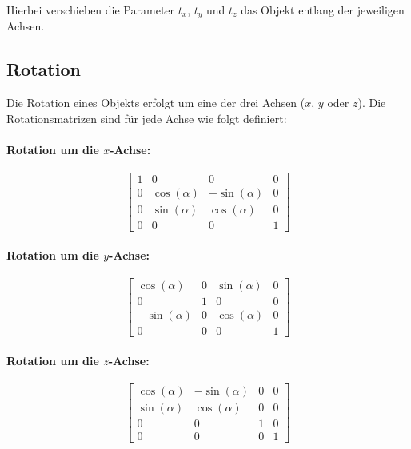 Hierbei verschieben die Parameter \(t_x\), \(t_y\) und \(t_z\) das Objekt entlang der jeweiligen Achsen.

\subsection{Rotation}

Die Rotation eines Objekts erfolgt um eine der drei Achsen (\(x\), \(y\) oder \(z\)). Die Rotationsmatrizen sind für jede Achse wie folgt definiert:

\paragraph{Rotation um die \(x\)-Achse:}
\begin{equation}
\begin{bmatrix}
1 & 0 & 0 & 0 \\
0 & \cos(\alpha) & -\sin(\alpha) & 0 \\
0 & \sin(\alpha) & \cos(\alpha) & 0 \\
0 & 0 & 0 & 1
\end{bmatrix}
\end{equation}

\paragraph{Rotation um die \(y\)-Achse:}
\begin{equation}
\begin{bmatrix}
\cos(\alpha) & 0 & \sin(\alpha) & 0 \\
0 & 1 & 0 & 0 \\
-\sin(\alpha) & 0 & \cos(\alpha) & 0 \\
0 & 0 & 0 & 1
\end{bmatrix}
\end{equation}

\paragraph{Rotation um die \(z\)-Achse:}
\begin{equation}
\begin{bmatrix}
\cos(\alpha) & -\sin(\alpha) & 0 & 0 \\
\sin(\alpha) & \cos(\alpha) & 0 & 0 \\
0 & 0 & 1 & 0 \\
0 & 0 & 0 & 1
\end{bmatrix}
\end{equation}

